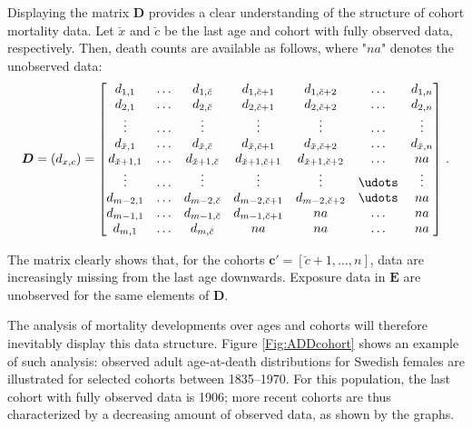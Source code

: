 \documentclass[11pt, a4paper]{article}
\newcommand{\tikzmark}[1]{\tikz[overlay,remember picture,baseline=(#1.base)]
	\node (#1) {\strut};}
\begin{document}
{Displaying the matrix $\bm{D}$ provides a clear understanding of the structure of cohort mortality data.  Let $\breve{x}$ and $\breve{c}$ be the last age and cohort with fully observed data, respectively. Then, death counts are available as follows, where "$na$" denotes the unobserved data:
%
\begin{equation}\label{Eq:Dmat}
\bm{D} = (d_{{x,c}}) = \begin{bmatrix} 
d_{1,1} & \dots & d_{1,\breve{c}} & d_{1,\breve{c}+1} & d_{1,\breve{c}+2} & \dots &  d_{1,n} \\
d_{2,1} & \dots & d_{2,\breve{c}} & d_{2,\breve{c}+1} & d_{2,\breve{c}+2} & \dots &  d_{2,n} \\
\vdots & \dots & \vdots & \vdots & \vdots & \dots &   \vdots \\
d_{\breve{x},1} & \dots & d_{\breve{x},\breve{c}} & d_{\breve{x},\breve{c}+1} & d_{\breve{x},\breve{c}+2} & \dots &  d_{\breve{x},n} \\
d_{\breve{x}+1,1} & \dots & d_{\breve{x}+1,\breve{c}} & d_{\breve{x}+1,\breve{c}+1} & d_{\breve{x}+1,\breve{c}+2} & \dots &  na \\
\vdots & \dots & \vdots & \vdots & \vdots & \udots &   \vdots \\
d_{m-2,1} & \dots & d_{m-2,\breve{c}} & d_{m-2,\breve{c}+1} & d_{m-2,\breve{c}+2} & \udots  & na \\
d_{m-1,1} & \dots & d_{m-1,\breve{c}} & d_{m-1,\breve{c}+1} &  na  & \dots & na \\
\tikzmark{lower1}d_{m,1} & \dots & d_{m,\breve{c}}\tikzmark{lower2} & \tikzmark{lowerA}na  & na  & \dots & na\tikzmark{lowerB}
\end{bmatrix} \, . \notag
\end{equation}
%


\medskip The matrix clearly shows that, for the cohorts $\bm{c}'=\left[\breve{c}+1,\dots,n\right]$, data are increasingly missing from the last age downwards. Exposure data in $\bm{E}$ are unobserved for the same elements of $\bm{D}$.  

The analysis of mortality developments over ages and cohorts will therefore inevitably display this data structure. Figure \ref{Fig:ADDcohort} shows an example of such analysis: observed adult age-at-death distributions for Swedish females are illustrated for selected cohorts between 1835--1970. For this population, the last cohort with fully observed data is 1906; more recent cohorts are thus characterized by a decreasing amount of observed data, as shown by the graphs.

}
\end{document}
